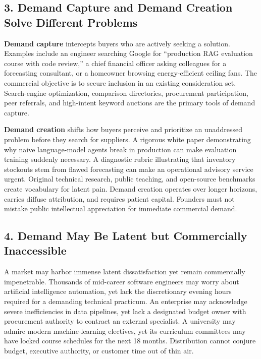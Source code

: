 \subsection*{3. Demand Capture and Demand Creation Solve Different Problems}

\textbf{Demand capture} intercepts buyers who are actively seeking a solution. Examples include an engineer searching Google for ``production RAG evaluation course with code review,'' a chief financial officer asking colleagues for a forecasting consultant, or a homeowner browsing energy-efficient ceiling fans. The commercial objective is to secure inclusion in an existing consideration set. Search-engine optimization, comparison directories, procurement participation, peer referrals, and high-intent keyword auctions are the primary tools of demand capture.

\textbf{Demand creation} shifts how buyers perceive and prioritize an unaddressed problem before they search for suppliers. A rigorous white paper demonstrating why naive language-model agents break in production can make evaluation training suddenly necessary. A diagnostic rubric illustrating that inventory stockouts stem from flawed forecasting can make an operational advisory service urgent. Original technical research, public teaching, and open-source benchmarks create vocabulary for latent pain. Demand creation operates over longer horizons, carries diffuse attribution, and requires patient capital. Founders must not mistake public intellectual appreciation for immediate commercial demand.

\subsection*{4. Demand May Be Latent but Commercially Inaccessible}

A market may harbor immense latent dissatisfaction yet remain commercially impenetrable. Thousands of mid-career software engineers may worry about artificial intelligence automation, yet lack the discretionary evening hours required for a demanding technical practicum. An enterprise may acknowledge severe inefficiencies in data pipelines, yet lack a designated budget owner with procurement authority to contract an external specialist. A university may admire modern machine-learning electives, yet its curriculum committees may have locked course schedules for the next 18 months. Distribution cannot conjure budget, executive authority, or customer time out of thin air.

